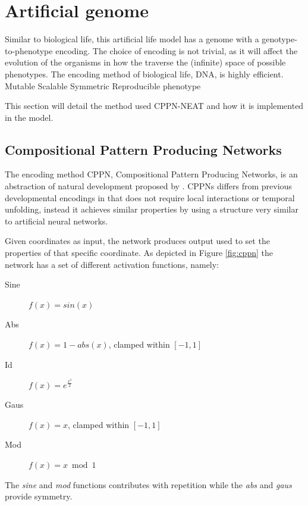 \section{Artificial genome}
Similar to biological life, this artificial life model has a genome with a genotype-to-phenotype encoding. The choice of encoding is not trivial, as it will affect the evolution of the organisms in how the traverse the (infinite) space of possible phenotypes. The encoding method of biological life, DNA, is highly efficient.
Mutable
Scalable
Symmetric
Reproducible phenotype

This section will detail the method used CPPN-NEAT and how it is implemented in the model.

\subsection{Compositional Pattern Producing Networks} \label{subsec:CPPN}
The encoding method CPPN, Compositional Pattern Producing Networks, is an abstraction of natural development proposed by \cite{stanley2007compositional}. CPPNs differs from previous developmental encodings in that does not require local interactions or temporal unfolding, instead it achieves similar properties by using a structure very similar to artificial neural networks.

Given coordinates as input, the network produces output used to set the properties of that specific coordinate. As depicted in Figure \ref{fig:cppn} the network has a set of different activation functions, namely:
\begin{description}
    \item[Sine] \(f(x) = sin(x)\)
    \item[Abs] \(f(x) = 1- abs(x)\), clamped within \([-1,1]\)
    \item[Id] \(f(x) = e^{\frac{x^2}{2}}\)
    \item[Gaus] \(f(x) = x\), clamped within \([-1,1]\)
    \item[Mod] \(f(x) = x \bmod 1\)
\end{description}
The \emph{sine} and \emph{mod} functions contributes with repetition while the \emph{abs} and \emph{gaus} provide symmetry.

